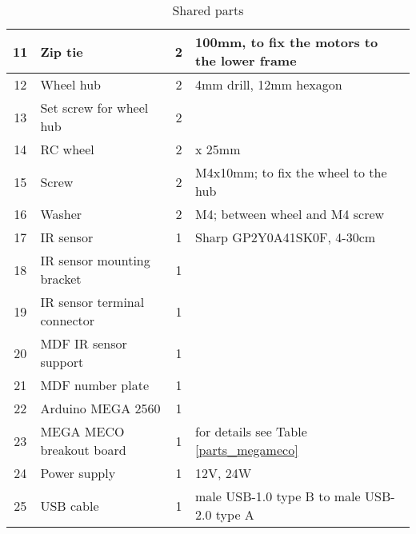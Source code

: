 \documentclass[10pt,a4paper]{article}
\begin{document}
\begin{table}[h]
\begin{tabular}{| c | l | c | l|}
  11       & Zip tie                      & 2    & \footnotesize 100mm, to fix the motors to the lower frame            \\ \hline
  12       & Wheel hub                    & 2    & \footnotesize 4mm drill, 12mm hexagon                                \\ \hline
  13       & Set screw for wheel hub      & 2    &                                                                      \\ \hline
  14       & RC wheel                     & 2    & \footnotesize \diameter 65mm x 25mm                                  \\ \hline
  15       & Screw                        & 2    & \footnotesize M4x10mm; to fix the wheel to the hub                   \\ \hline
  16       & Washer                       & 2    & \footnotesize M4; between wheel and M4 screw                         \\ \hline
  17       & IR sensor                    & 1    & \footnotesize Sharp GP2Y0A41SK0F, 4-30cm                             \\ \hline
  18       & IR sensor mounting bracket   & 1    &                                                                      \\ \hline
  19       & IR sensor terminal connector & 1    &                                                                      \\ \hline
  20       & MDF IR sensor support        & 1    &                                                                      \\ \hline
  21       & MDF number plate             & 1    &                                                                      \\ \hline
  22       & Arduino MEGA 2560            & 1    &                                                                      \\ \hline
  23       & MEGA MECO breakout board     & 1    & \footnotesize for details see Table \ref{parts_megameco}             \\ \hline
  24       & Power supply                 & 1    & \footnotesize 12V, 24W                                               \\ \hline
  25       & USB cable                    & 1    & \footnotesize male USB-1.0 type B to male USB-2.0 type A             \\ \hline
 \end{tabular}
 \caption{Shared parts}\label{parts_general}
\end{table}
\end{document}
